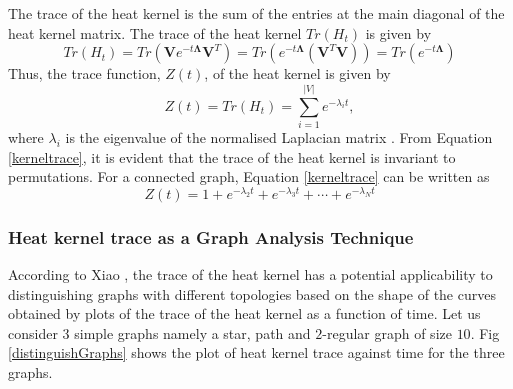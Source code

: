\documentclass[10pt,a4paper]{article}
\begin{document}
        The trace of the heat kernel is the sum of the entries at the main diagonal of the heat kernel matrix. 
        The trace of the heat kernel $Tr(H_t)$ is given by
        \begin{equation}
        Tr(H_t) = Tr(\mathbf{V} e^{-t \mathbf{\Lambda}} \mathbf{V}^T)=Tr( e^{-t\mathbf{\Lambda}} (\mathbf{V}^T \mathbf{V})) = Tr(e^{- t\mathbf{\Lambda}})
        \end{equation}
        Thus, the trace function, $Z(t)$, of the heat kernel is given by 
        \begin{equation}
        Z(t) = Tr(H_t) = \sum_{i=1}^{|V|} e^{-\lambda_i t},
        \label{kerneltrace}
        \end{equation}
        where $\lambda_i$ is the eigenvalue of the normalised Laplacian matrix \cite{xiao2009graph}. 
        From Equation \ref{kerneltrace}, it is evident that the trace of the heat kernel is invariant to permutations.
        For a connected graph, Equation \ref{kerneltrace} can be written as 
        \begin{equation}
        Z(t) =  1+ e^{-\lambda_2 t} + e^{-\lambda_3t} + \cdots + e^{-\lambda_N t}
        \end{equation}
        
        \subsubsection{Heat kernel trace as a Graph Analysis Technique}
        According to Xiao \cite{xiao2009graph}, the trace of the heat kernel has a potential applicability to distinguishing graphs with different topologies based on the shape of the curves obtained by plots of the trace of the heat kernel as a function of time. Let us consider $3$ simple graphs namely a star, path and $2$-regular graph of size $10$. Fig \ref{distinguishGraphs} shows the plot of heat kernel trace against time for the three graphs.
        
\end{document}
